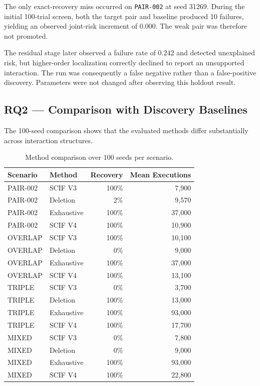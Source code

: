The only exact-recovery miss occurred on \texttt{PAIR-002} at seed 31269. During the initial 100-trial screen, both the target pair and baseline produced 10 failures, yielding an observed joint-risk increment of 0.000. The weak pair was therefore not promoted.

The residual stage later observed a failure rate of 0.242 and detected unexplained risk, but higher-order localization correctly declined to report an unsupported interaction. The run was consequently a false negative rather than a false-positive discovery. Parameters were not changed after observing this holdout result.

\subsection{RQ2 --- Comparison with Discovery Baselines}

The 100-seed comparison shows that the evaluated methods differ substantially across interaction structures.

\begin{table}[t]
\caption{Method comparison over 100 seeds per scenario.}
\label{tab:comparison}
\centering
\footnotesize
\setlength{\tabcolsep}{9pt}
\begin{tabular}{llrr}
\toprule
Scenario & Method & Recovery & Mean Executions \\
\midrule
PAIR-002 & SCIF V3    & 100\% & 7,900 \\
PAIR-002 & Deletion   & 2\%   & 9,570 \\
PAIR-002 & Exhaustive & 100\% & 37,000 \\
PAIR-002 & SCIF V4    & 100\% & 10,900 \\
\addlinespace
OVERLAP & SCIF V3    & 100\% & 10,100 \\
OVERLAP & Deletion   & 0\%   & 9,000 \\
OVERLAP & Exhaustive & 100\% & 37,000 \\
OVERLAP & SCIF V4    & 100\% & 13,100 \\
\addlinespace
TRIPLE & SCIF V3    & 0\%   & 3,700 \\
TRIPLE & Deletion   & 100\% & 13,000 \\
TRIPLE & Exhaustive & 100\% & 93,000 \\
TRIPLE & SCIF V4    & 100\% & 17,700 \\
\addlinespace
MIXED & SCIF V3    & 0\%   & 7,800 \\
MIXED & Deletion   & 0\%   & 9,000 \\
MIXED & Exhaustive & 100\% & 93,000 \\
MIXED & SCIF V4    & 100\% & 22,800 \\
\bottomrule
\end{tabular}
\end{table}

